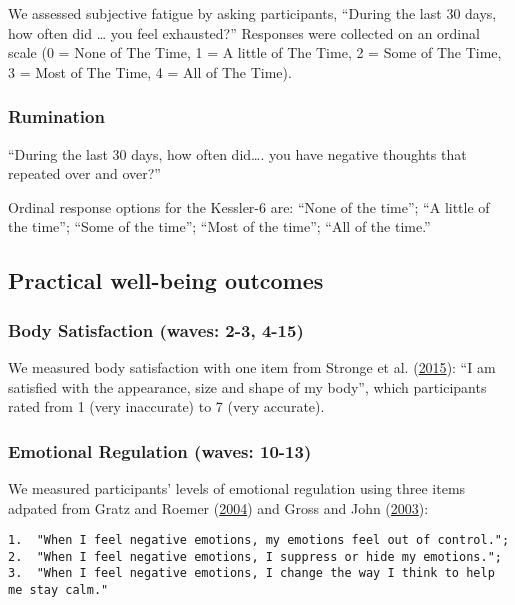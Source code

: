 \documentclass[
  singlecolumn]{report}
\begin{document}
We assessed subjective fatigue by asking participants, ``During the last
30 days, how often did \ldots{} you feel exhausted?'' Responses were
collected on an ordinal scale (0 = None of The Time, 1 = A little of The
Time, 2 = Some of The Time, 3 = Most of The Time, 4 = All of The Time).

\hypertarget{rumination}{%
\subsubsection{Rumination}\label{rumination}}

``During the last 30 days, how often did\ldots. you have negative
thoughts that repeated over and over?''

Ordinal response options for the Kessler-6 are: ``None of the time'';
``A little of the time''; ``Some of the time''; ``Most of the time'';
``All of the time.''

\hypertarget{practical-well-being-outcomes}{%
\subsection{Practical well-being
outcomes}\label{practical-well-being-outcomes}}

\hypertarget{body-satisfaction-waves-2-3-4-15}{%
\subsubsection{Body Satisfaction (waves: 2-3,
4-15)}\label{body-satisfaction-waves-2-3-4-15}}

We measured body satisfaction with one item from Stronge et al.
(\protect\hyperlink{ref-stronge_facebook_2015}{2015}): ``I am satisfied
with the appearance, size and shape of my body'', which participants
rated from 1 (very inaccurate) to 7 (very accurate).

\hypertarget{emotional-regulation-waves-10-13}{%
\subsubsection{Emotional Regulation (waves:
10-13)}\label{emotional-regulation-waves-10-13}}

We measured participants' levels of emotional regulation using three
items adpated from Gratz and Roemer
(\protect\hyperlink{ref-gratz_multidimensional_2004}{2004}) and Gross
and John (\protect\hyperlink{ref-gross_individual_2003}{2003}):

\begin{verbatim}
1.  "When I feel negative emotions, my emotions feel out of control.";
2.  "When I feel negative emotions, I suppress or hide my emotions.";
3.  "When I feel negative emotions, I change the way I think to help me stay calm."
\end{verbatim}
\end{document}
